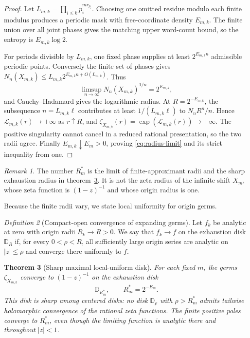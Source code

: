 \documentclass[11pt]{article}
\numberwithin{equation}{section}
\newtheorem{theorem}{Theorem}[section]
\theoremstyle{remark}
\newtheorem{remark}[theorem]{Remark}
\newtheorem{definition}[theorem]{Definition}
\newcommand{\cL}{\mathcal L}
\newcommand{\D}{\mathbb D}
\begin{document}
\begin{proof}
Let $L_{m,k}=\prod_{i\le k}p_i^{m r_{p_i}}$.  Choosing one omitted residue
modulo each finite modulus produces a periodic mask with free-coordinate
density $E_{m,k}$.  The finite union over all joint phases gives the
matching upper word-count bound, so the entropy is $E_{m,k}\log2$.

For periods divisible by $L_{m,k}$, one fixed phase supplies at least
\(
2^{E_{m,k}n}
\)
admissible periodic points.  Conversely the finite set of phases gives
\(
N_n(X_{m,k})\le L_{m,k}2^{E_{m,k}n+O(L_{m,k})}
\).
Thus
\[
 \limsup_{n\to\infty}N_n(X_{m,k})^{1/n}=2^{E_{m,k}},
\]
and Cauchy--Hadamard gives the logarithmic radius.  At
$R=2^{-E_{m,k}}$, the subsequence $n=L_{m,k}\ell$ contributes at least
$1/(L_{m,k}\ell)$ to $N_nR^n/n$.  Hence
\(
\cL_{m,k}(r)\to+\infty
\)
as $r\uparrow R$, and
\(
\zeta_{X_{m,k}}(r)=\exp(\cL_{m,k}(r))\to+\infty
\).
The positive singularity cannot cancel in a reduced rational presentation,
so the two radii agree.  Finally $E_{m,k}\downarrow E_m>0$, proving
\eqref{eq:radius-limit} and its strict inequality from one.
\end{proof}

\begin{remark}
The number $R_m^*$ is the limit of finite-approximant radii and the sharp
exhaustion radius in theorem~\ref{thm:sharp-disk}.  It is not the zeta radius
of the infinite shift $X_m$, whose zeta function is $(1-z)^{-1}$ and whose
origin radius is one.
\end{remark}

Because the finite radii vary, we state local uniformity for origin germs.

\begin{definition}[Compact-open convergence of expanding germs]
Let $f_k$ be analytic at zero with origin radii $R_k\to R>0$.  We say
that $f_k\to f$ on the exhaustion disk $\D_R$ if, for every
$0<\rho<R$, all sufficiently large origin series are analytic on
$|z|\le\rho$ and converge there uniformly to $f$.
\end{definition}

\begin{theorem}[Sharp maximal local-uniform disk]
\label{thm:sharp-disk}
For each fixed $m$, the germs $\zeta_{X_{m,k}}$ converge to
$(1-z)^{-1}$ on the exhaustion disk
\begin{equation}
 \D_{R_m^*},
 \qquad R_m^*=2^{-E_m}.
 \label{eq:exhaustion-disk}
\end{equation}
This disk is sharp among centered disks: no disk $\D_\rho$ with
\(\rho>R_m^*\) admits tailwise holomorphic convergence of the rational zeta
functions.  The finite positive poles converge to $R_m^*$, even though
the limiting function is analytic there and throughout $|z|<1$.
\end{theorem}
\end{document}
